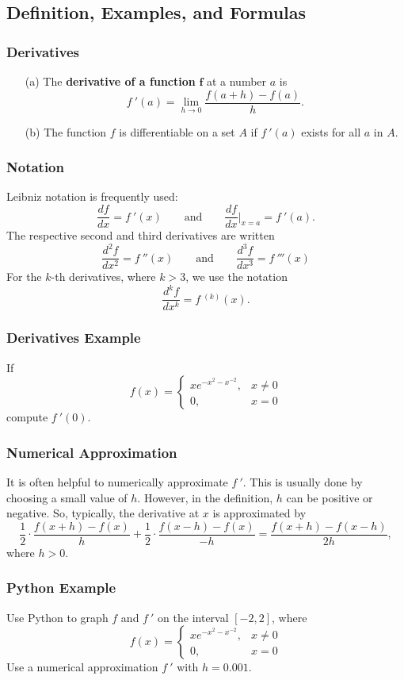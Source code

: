 \documentclass{beamer}
\begin{document}
\subsection{Definition, Examples, and Formulas}
\begin{frame}
\begin{Definition}
\frametitle{Derivatives}
\begin{enumerate}
\item[(a)] The {\bf derivative of a function} $\boldsymbol f$ at a number $a$ is
$$
f\ ' (a) = \lim_{h\to 0}\frac{f(a + h) - f(a)}{h}.
$$
\item[(b)] The function $f$ is differentiable on a set $A$ if $f\ '(a)$ exists for all $a$ in $A$.
\end{enumerate}
\end{Definition} 
\end{frame}

\begin{frame}
\frametitle{Notation}
Leibniz notation is frequently used:
$$
\frac{d f}{dx} = f\ '(x)\qquad\text{and}\qquad \frac{d f}{dx}\Big|_{x = a} = f\ '(a).
$$
The respective second and third derivatives are written
$$
\frac{d^2 f}{dx^2} = f\ ''(x)\qquad\text{and}\qquad \frac{d^3 f}{dx^3} = f\ '''(x)
$$
For the $k$-th derivatives, where $k > 3$, we use the notation
$$
\frac{d^k f}{dx^k} = f\ ^{(k)}(x).
$$
\end{frame}

\begin{frame}[t]
\frametitle{Derivatives Example}
\small
\begin{Example}
If
$$
f(x) = \begin{cases} x e^{-x^2 - x^{-2}}, & x \neq 0\\ 0,	& x= 0\end{cases}
$$
compute $f\ ' (0)$.
\end{Example}
\end{frame}

\begin{frame}
\frametitle{Numerical Approximation}
It is often helpful to numerically approximate $f\ '$. This is usually done by choosing a small value of $h$. However, in the definition, $h$ can be positive or negative. So, typically, the derivative at $x$ is approximated by
$$
\frac{1}{2}\cdot \frac{f(x + h) - f(x)}{h} + \frac{1}{2}\cdot \frac{f(x - h) - f(x)}{-h} = \frac{f(x + h) - f(x - h)}{2 h},
$$
where $h > 0$.
\end{frame}

\begin{frame}
\frametitle{Python Example}
\begin{Example}
Use Python to graph $f$ and $f\ '$ on the interval $[-2, 2]$, where
$$
f(x) = \begin{cases} x e^{-x^2 - x^{-2}}, & x \neq 0\\ 0,	& x= 0\end{cases}
$$
Use a numerical approximation $f\ '$ with $h = 0.001$.
\end{Example}
\end{frame}
\end{document}
